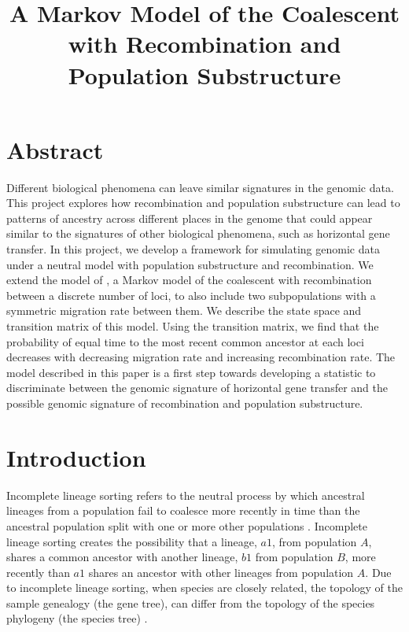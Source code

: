 \documentclass[11pt,oneside]{amsart}
\begin{document}
\linenumbers

\theoremstyle{plain}
\newtheorem{theorem}{Theorem}[section]
\newtheorem{lemma}[theorem]{Lemma}
\newtheorem{corollary}[theorem]{Corollary}
\newtheorem{proposition}[theorem]{Proposition}
\newtheorem{definition}[theorem]{Definition}

\title{A Markov Model of the Coalescent with Recombination and Population Substructure}

\maketitle

\section{Abstract}
\label{Section: Abstract}

Different biological phenomena can leave similar signatures in the genomic data. This project explores how recombination and population substructure can lead to patterns of ancestry across different places in the genome that could appear similar to the signatures of other biological phenomena, such as horizontal gene transfer. In this project, we develop a framework for simulating genomic data under a neutral model with population substructure and recombination. We extend the model of \cite{SimonsenChurchill1997}, a Markov model of the coalescent with recombination between a discrete number of loci, to also include two subpopulations with a symmetric migration rate between them. We describe the state space and transition matrix of this model. Using the transition matrix, we find that the probability of equal time to the most recent common ancestor at each loci decreases with decreasing migration rate and increasing recombination rate. The model described in this paper is a first step towards developing a statistic to discriminate between the genomic signature of horizontal gene transfer and the possible genomic signature of recombination and population substructure.

\section{Introduction}
\label{Section: Introduction}

Incomplete lineage sorting refers to the neutral process by which ancestral lineages from a population fail to coalesce more recently in time than the ancestral population split with one or more other populations \citep{DegnanRosenberg2009}. Incomplete lineage sorting creates the possibility that a lineage, $a1$, from population $A$, shares a common ancestor with another lineage, $b1$ from population $B$, more recently than $a1$ shares an ancestor with other lineages from population $A$. Due to incomplete lineage sorting, when species are closely related, the topology of the sample genealogy (the gene tree), can differ from the topology of the species phylogeny (the species tree) \citep{Hudson1983, Tajima1983}.
\end{document}
